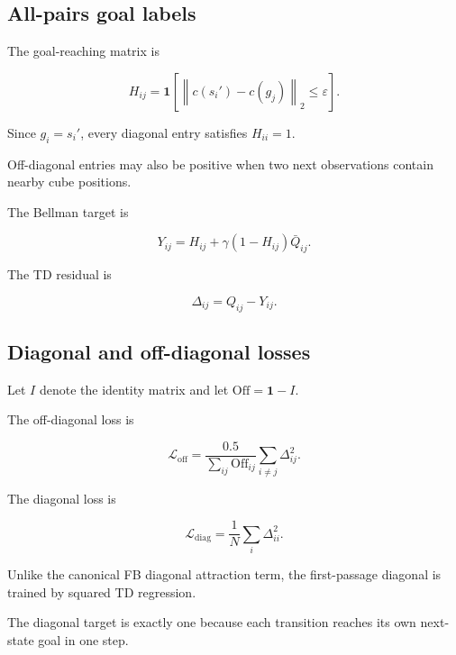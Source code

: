 \documentclass[11pt]{article}
\newcommand{\one}{\mathbf{1}}
\newcommand{\norm}[1]{\left\lVert #1 \right\rVert}
\theoremstyle{remark}
\begin{document}
\subsection{All-pairs goal labels}

The goal-reaching matrix is

\begin{equation}
H_{ij}=\one\left[\norm{c(s_i')-c(g_j)}_2\leq\varepsilon\right].
\label{eq:hit-matrix}
\end{equation}

Since $g_i=s_i'$, every diagonal entry satisfies $H_{ii}=1$.

Off-diagonal entries may also be positive when two next observations contain nearby cube positions.

The Bellman target is

\begin{equation}
Y_{ij}=H_{ij}+\gamma(1-H_{ij})\bar Q_{ij}.
\label{eq:target}
\end{equation}

The TD residual is

\begin{equation}
\Delta_{ij}=Q_{ij}-Y_{ij}.
\label{eq:residual}
\end{equation}

\subsection{Diagonal and off-diagonal losses}

Let $I$ denote the identity matrix and let $\mathrm{Off}=\mathbf 1-I$.

The off-diagonal loss is

\begin{equation}
\mathcal L_{\mathrm{off}}=\frac{0.5}{\sum_{ij}\mathrm{Off}_{ij}}\sum_{i\neq j}\Delta_{ij}^2.
\label{eq:off-loss}
\end{equation}

The diagonal loss is

\begin{equation}
\mathcal L_{\mathrm{diag}}=\frac{1}{N}\sum_i\Delta_{ii}^2.
\label{eq:diag-loss}
\end{equation}

Unlike the canonical FB diagonal attraction term, the first-passage diagonal is trained by squared TD regression.

The diagonal target is exactly one because each transition reaches its own next-state goal in one step.
\end{document}
